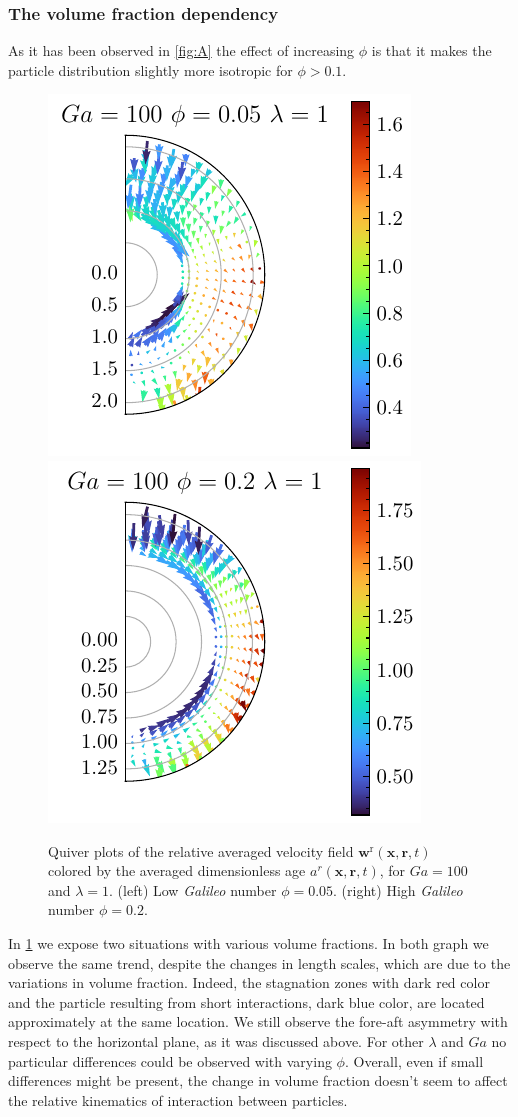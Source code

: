 \subsubsection*{The volume fraction dependency}
As it has been observed in \ref{fig:A} the effect of increasing $\phi$ is that it makes the particle distribution slightly more isotropic for $\phi >0.1$. 
\begin{figure}[h!]
    \centering
    \includegraphics[height=0.35\textwidth]{image/HOMOGENEOUS_NEW/Dist/U_rel_l_1_Ga_100_PHI_5.pdf}
    \includegraphics[height=0.35\textwidth]{image/HOMOGENEOUS_NEW/Dist/U_rel_l_1_Ga_100_PHI_20.pdf}
    \caption{Quiver plots of the relative averaged velocity field $\textbf{w}^\text{r}(\textbf{x},\textbf{r},t)$ colored by the averaged dimensionless age $a^r(\textbf{x},\textbf{r},t)$, for $Ga = 100$ and $\lambda = 1$. 
    (left) Low \textit{Galileo} number $\phi = 0.05$.
    (right) High \textit{Galileo} number $\phi = 0.2$. }
    \label{fig:Why_Phi_matter}
\end{figure}
In \ref{fig:Why_Phi_matter} we expose two situations with various volume fractions. 
In both graph we observe the same trend, despite the changes in length scales, which are due to the variations in volume fraction. 
Indeed, the stagnation zones with dark red color and the particle resulting from short interactions, dark blue color, are located approximately at the same location. 
We still observe the fore-aft asymmetry with respect to the horizontal plane, as it was discussed above. 
For other $\lambda$ and $Ga$ no particular differences could be observed with varying $\phi$. 
Overall, even if small differences might be present, the change in volume fraction doesn't seem to affect the relative kinematics   of interaction between particles. 

